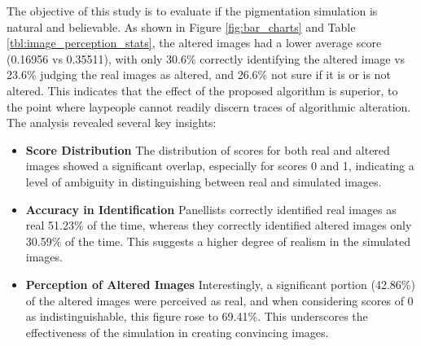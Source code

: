 \begin{spacing}{1.5}
\begin{table}[t!]
    \label{tbl:image_perception_stats}
\end{table}
The objective of this study is to evaluate if the pigmentation simulation is natural and believable. As shown in Figure \ref{fig:bar_charts} and Table \ref{tbl:image_perception_stats}, the altered images had a lower average score (0.16956 vs 0.35511), with only 30.6\% correctly identifying the altered image vs 23.6\% judging the real images as altered, and 26.6\% not sure if it is or is not altered. This indicates that the effect of the proposed algorithm is superior, to the point where laypeople cannot readily discern traces of algorithmic alteration.
The analysis revealed several key insights:
\begin{itemize}
    \item \textbf{Score Distribution} The distribution of scores for both real and altered images showed a significant overlap, especially for scores 0 and 1, indicating a level of ambiguity in distinguishing between real and simulated images.
    \item \textbf{Accuracy in Identification} Panellists correctly identified real images as real 51.23\% of the time, whereas they correctly identified altered images only 30.59\% of the time. This suggests a higher degree of realism in the simulated images.
    \item \textbf{Perception of Altered Images} Interestingly, a significant portion (42.86\%) of the altered images were perceived as real, and when considering scores of 0 as indistinguishable, this figure rose to 69.41\%. This underscores the effectiveness of the simulation in creating convincing images.
\end{itemize}
\end{spacing}
\newpage
